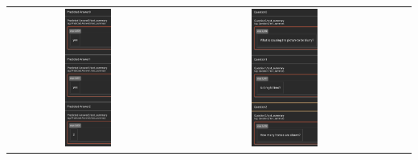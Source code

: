\documentclass{article}
\begin{document}
\begin{tabular}{ccc}
    \includegraphics[width=0.3\textwidth]{q2.6_15.png} &
    \includegraphics[width=0.3\textwidth]{q2.6_16.png} \\
\end{tabular}
\end{document}

